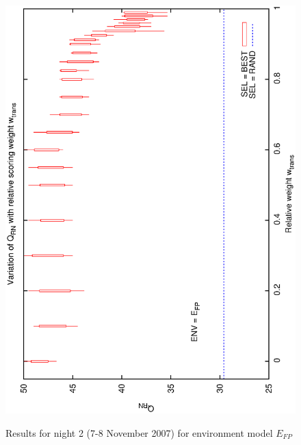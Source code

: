 \begin{figure}[h]
\begin{center}
{    \includegraphics[scale=0.25, angle=-90]{figures/cs1_dw1_rn.eps}
  }
\caption{Results for night 2 (7-8 November 2007) for environment model $E_{FP}$} 
 \end{center}
\end{figure}


